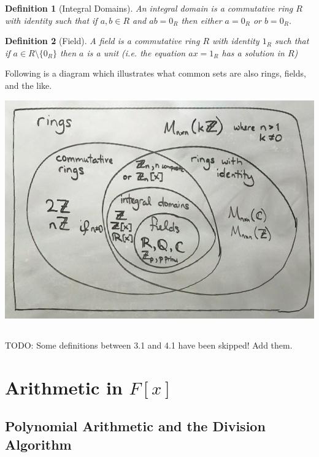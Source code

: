 \documentclass{article}
\theoremstyle{break}
\newtheorem{definition}{Definition}[subsection]
\begin{document}
\begin{definition}[Integral Domains]
  An integral domain is a commutative ring $R$ with identity such that if $a, b
  \in R$ and $ab = 0_R$ then either $a = 0_R$ or $b = 0_R$.
\end{definition}

\begin{definition}[Field]
  A field is a commutative ring $R$ with identity $1_R$ such that if $a \in R
  \setminus \{0_R\}$ then $a$ is a unit (i.e. the equation $ax = 1_R$ has a
  solution in $R$)
\end{definition}

Following is a diagram which illustrates what common sets are also rings,
fields, and the like.

\includegraphics[width=\linewidth]{ring-venn-diagram.jpg}

\subsection{}
TODO: Some definitions between 3.1 and 4.1 have been skipped! Add them.

\section{Arithmetic in $F[x]$}
\subsection{Polynomial Arithmetic and the Division Algorithm}
\end{document}
